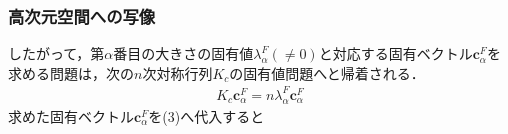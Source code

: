 \documentclass[dvipdfmx,cjk]{beamer}
\theoremstyle{example}
\begin{document}
\begin{frame}
    \frametitle{高次元空間への写像}
    したがって，第$\alpha$番目の大きさの固有値$\lambda_\alpha^F(\neq0)$と対応する固有ベクトル$\boldsymbol{c}_\alpha^F$を求める問題は，次の$n$次対称行列$K_c$の固有値問題へと帰着される．
    \begin{align*}
        K_c\boldsymbol{c}_\alpha^F=n\lambda_\alpha^F\boldsymbol{c}_\alpha^F
    \end{align*}
    求めた固有ベクトル$\boldsymbol{c}_\alpha^F$を(3)へ代入すると
\end{frame}
\end{document}

